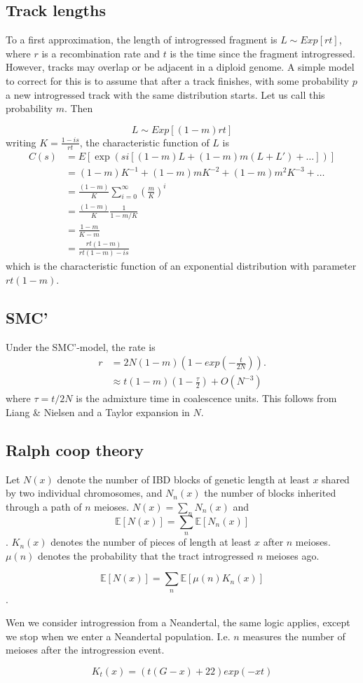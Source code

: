 \documentclass[10pt,a4paper]{article}
\newcommand{\BE}[1]{\mathbb{E}\left[#1\right]}
\begin{document}
\subsection{Track lengths}
To a first approximation, the length of introgressed fragment is 
$L \sim Exp[r t ]$, where $r$ is a recombination rate and $t$ is the time since the fragment introgressed. However, tracks may overlap or be adjacent in a diploid genome. A simple model to correct for this is to assume that after a track finishes, with some probability $p$ a new introgressed track with the same distribution starts. Let us call this probability $m$. Then

\begin{equation}
L \sim Exp[(1-m)rt]
\end{equation}
writing $K = \frac{1-is}{rt}$, the characteristic function of $L$ is
\begin{align}
C(s) &= E[\exp(si [(1-m)L + (1-m)m (L+L')+ \dots  ] )]\nonumber\\
&=(1-m) K^{-1} + (1-m)m K^{-2} +(1-m)m^2 K^{-3} + \dots\nonumber\\
&=\frac{(1-m)}{K} \sum_{i=0}^\infty \left(\frac{m}{K}\right)^{i} \nonumber\\
&= \frac{(1-m)}{K} \frac{1}{1 - m/K}\nonumber\\
&= \frac{1-m}{K-m}\nonumber\\
&= \frac{rt(1-m)}{rt (1-m) - is}\nonumber
\end{align}
which is the characteristic function of an exponential distribution with parameter $rt(1-m)$.

\subsection{SMC'}
Under the SMC'-model, the rate is 
\begin{align}
r &= 2 N (1-m) \left(1 - exp\left({-\frac{t}{2N}}\right)\right).\\
& \approx t (1-m) \left( 1- \frac{\tau}{2}\right) + O\left(N^{-3}\right)
\end{align}
where $\tau = t/2N$ is the admixture time in coalescence units. This follows from Liang \& Nielsen and a Taylor expansion in $N$.


\subsection{Ralph coop theory}
Let $N(x)$ denote the number of IBD blocks of genetic length at least $x$ shared by two individual chromosomes, and $N_n(x)$ the number of blocks inherited through a path of $n$ meioses. $N(x) = \sum_n N_n(x)$ and
$$\BE{N(x)} = \sum_n \BE{N_n(x)}$$. $K_n(x)$ denotes the number of pieces of length at least $x$ after $n$ meioses. $\mu(n)$ denotes the probability that the tract introgressed $n$ meioses ago. 

$$\BE{N(x)} = \sum_n \BE{\mu(n) K_n (x)}$$.

Wen we consider introgression from a Neandertal, the same logic applies, except we stop when we enter a Neandertal population. I.e. $n$ measures the number of meioses after the introgression event.

$$K_t(x) = (t(G - x) +22) exp(-x t)$$
\end{document}
